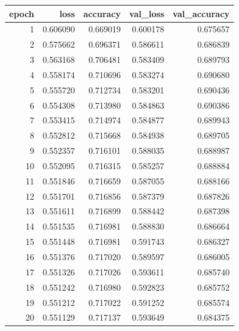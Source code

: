 \begin{tabular}{rrrrr}
\toprule
epoch & loss & accuracy & val_loss & val_accuracy \\
\midrule
1 & 0.606090 & 0.669019 & 0.600178 & 0.675657 \\
2 & 0.575662 & 0.696371 & 0.586611 & 0.686839 \\
3 & 0.563168 & 0.706481 & 0.583409 & 0.689793 \\
4 & 0.558174 & 0.710696 & 0.583274 & 0.690680 \\
5 & 0.555720 & 0.712734 & 0.583201 & 0.690436 \\
6 & 0.554308 & 0.713980 & 0.584863 & 0.690386 \\
7 & 0.553415 & 0.714974 & 0.584877 & 0.689943 \\
8 & 0.552812 & 0.715668 & 0.584938 & 0.689705 \\
9 & 0.552357 & 0.716101 & 0.588035 & 0.688987 \\
10 & 0.552095 & 0.716315 & 0.585257 & 0.688884 \\
11 & 0.551846 & 0.716659 & 0.587055 & 0.688166 \\
12 & 0.551701 & 0.716856 & 0.587379 & 0.687826 \\
13 & 0.551611 & 0.716899 & 0.588442 & 0.687398 \\
14 & 0.551535 & 0.716981 & 0.588830 & 0.686664 \\
15 & 0.551448 & 0.716981 & 0.591743 & 0.686327 \\
16 & 0.551376 & 0.717020 & 0.589597 & 0.686005 \\
17 & 0.551326 & 0.717026 & 0.593611 & 0.685740 \\
18 & 0.551242 & 0.716980 & 0.592823 & 0.685752 \\
19 & 0.551212 & 0.717022 & 0.591252 & 0.685574 \\
20 & 0.551129 & 0.717137 & 0.593649 & 0.684375 \\
\bottomrule
\end{tabular}
